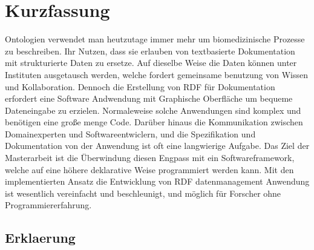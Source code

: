 \chapter*{Kurzfassung}

Ontologien verwendet man heutzutage immer mehr um biomedizinische Prozesse zu beschreiben. Ihr Nutzen, dass sie erlauben von textbasierte Dokumentation mit strukturierte Daten zu ersetze. Auf dieselbe Weise die Daten können unter Instituten ausgetausch werden, welche fordert gemeinsame benutzung von Wissen und Kollaboration. Dennoch die Erstellung von RDF für Dokumentation erfordert eine Software Andwendung mit Graphische Oberfläche um bequeme Dateneingabe zu erzielen. Normaleweise solche Anwendungen sind komplex und benötigen eine große menge Code. Darüber hinaus die Kommunikation zwischen Domainexperten und Softwareentwiclern, und die Spezifikation und Dokumentation von der Anwendung ist oft eine langwierige Aufgabe. Das Ziel der Masterarbeit ist die Überwindung diesen Engpass mit ein Softwareframework, welche auf eine höhere deklarative Weise programmiert werden kann. Mit den implementierten Ansatz die Entwicklung von RDF datenmanagement Anwendung ist wesentlich vereinfacht und beschleunigt, und möglich für Forscher ohne Programmiererfahrung. 

\linespread{1.25}\selectfont

\tableofcontents %
\listoffigures  %
\listoftables
\blankpage
\blankpage






%

\blankpage

\begin{appendices}
	\blankpage
	
\end{appendices}

\pagestyle{empty}
\newpage
\section*{Erklaerung}

